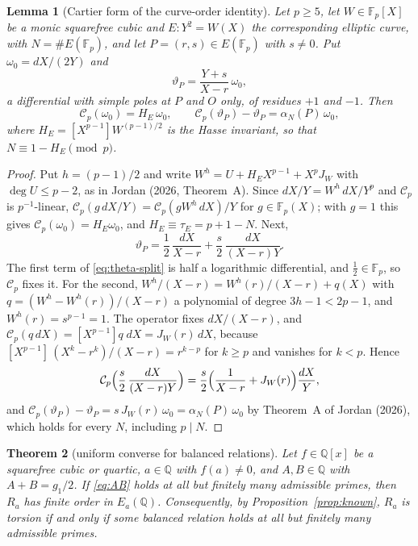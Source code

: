 \documentclass[11pt,a4paper]{article}
\numberwithin{equation}{section}
\theoremstyle{plain}
\newtheorem{theorem}{Theorem}[section]
\newtheorem{lemma}[theorem]{Lemma}
\theoremstyle{definition}
\newcommand{\F}{\mathbb{F}}
\newcommand{\Q}{\mathbb{Q}}
\begin{document}
\begin{lemma}[Cartier form of the curve-order identity]\label{lem:cartier}
Let $p\ge5$, let $W\in\F_p[X]$ be a monic squarefree cubic and $E:Y^2=W(X)$ the corresponding elliptic curve, with $N=\#E(\F_p)$, and let $P=(r,s)\in E(\F_p)$ with $s\neq0$. Put $\omega_0=dX/(2Y)$ and
\begin{equation}\label{eq:theta}
\vartheta_P=\frac{Y+s}{X-r}\,\omega_0,
\end{equation}
a differential with simple poles at $P$ and $O$ only, of residues $+1$ and $-1$. Then
\begin{equation}\label{eq:cartier-id}
\mathcal C_p(\omega_0)=H_E\,\omega_0,\qquad \mathcal C_p(\vartheta_P)-\vartheta_P=\alpha_N(P)\,\omega_0,
\end{equation}
where $H_E=[X^{p-1}]W^{(p-1)/2}$ is the Hasse invariant, so that $N\equiv1-H_E\pmod p$.
\end{lemma}

\begin{proof}
Put $h=(p-1)/2$ and write $W^h=U+H_EX^{p-1}+X^pJ_W$ with $\deg U\le p-2$, as in Jordan (2026, Theorem~A). Since $dX/Y=W^h\,dX/Y^p$ and $\mathcal C_p$ is $p^{-1}$-linear, $\mathcal C_p(g\,dX/Y)=\mathcal C_p(gW^h\,dX)/Y$ for $g\in\F_p(X)$; with $g=1$ this gives $\mathcal C_p(\omega_0)=H_E\omega_0$, and $H_E\equiv\tau_E=p+1-N$. Next,
\begin{equation}\label{eq:theta-split}
\vartheta_P=\frac12\,\frac{dX}{X-r}+\frac s2\,\frac{dX}{(X-r)Y}.
\end{equation}
The first term of \eqref{eq:theta-split} is half a logarithmic differential, and $\tfrac12\in\F_p$, so $\mathcal C_p$ fixes it. For the second, $W^h/(X-r)=W^h(r)/(X-r)+q(X)$ with $q=(W^h-W^h(r))/(X-r)$ a polynomial of degree $3h-1<2p-1$, and $W^h(r)=s^{p-1}=1$. The operator fixes $dX/(X-r)$, and $\mathcal C_p(q\,dX)=[X^{p-1}]q\;dX=J_W(r)\,dX$, because $[X^{p-1}]\,(X^k-r^k)/(X-r)=r^{k-p}$ for $k\ge p$ and vanishes for $k<p$. Hence
\begin{equation}\label{eq:cartier-second}
\mathcal C_p\Bigl(\frac s2\,\frac{dX}{(X-r)Y}\Bigr)=\frac s2\Bigl(\frac1{X-r}+J_W(r)\Bigr)\frac{dX}{Y},
\end{equation}
and $\mathcal C_p(\vartheta_P)-\vartheta_P=s\,J_W(r)\,\omega_0=\alpha_N(P)\,\omega_0$ by Theorem~A of Jordan (2026), which holds for every $N$, including $p\mid N$.
\end{proof}

\begin{theorem}[uniform converse for balanced relations]\label{thm:balanced}
Let $f\in\Q[x]$ be a squarefree cubic or quartic, $a\in\Q$ with $f(a)\neq0$, and $A,B\in\Q$ with $A+B=g_1/2$. If \eqref{eq:AB} holds at all but finitely many admissible primes, then $R_a$ has finite order in $E_a(\Q)$. Consequently, by Proposition~\ref{prop:known}, $R_a$ is torsion if and only if some balanced relation holds at all but finitely many admissible primes.
\end{theorem}
\end{document}
